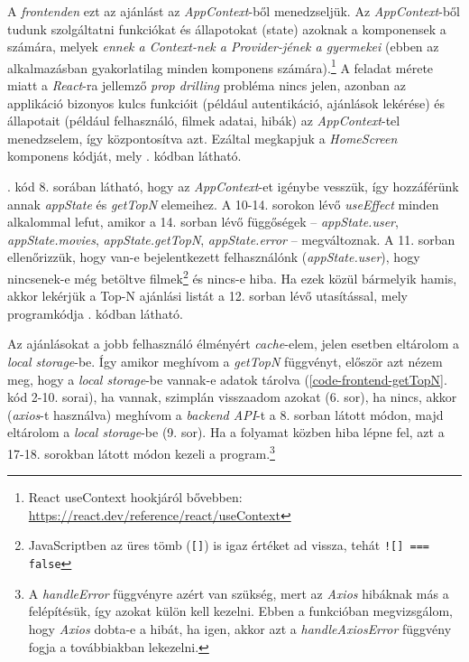 \documentclass[
]{thesis-ekf}
\theoremstyle{definition}
\theoremstyle{remark}
\begin{document}
A \emph{frontenden} ezt az ajánlást az \emph{AppContext}-ből menedzseljük. Az \emph{AppContext}-ből tudunk szolgáltatni funkciókat és állapotokat (state) azoknak a komponensek a számára, melyek \emph{ennek a Context-nek a Provider-jének a gyermekei} (ebben az alkalmazásban gyakorlatilag minden komponens számára).\footnote{React useContext hookjáról bővebben: \url{https://react.dev/reference/react/useContext}} A feladat mérete miatt a \emph{React}-ra jellemző \emph{prop drilling} probléma nincs jelen, azonban az applikáció bizonyos kulcs funkcióit (például autentikáció, ajánlások lekérése) és állapotait (például felhasználó, filmek adatai, hibák) az \emph{AppContext}-tel menedzselem, így központosítva azt. Ezáltal megkapjuk a \emph{HomeScreen} komponens kódját, mely . kódban látható.



. kód 8. sorában látható, hogy az \emph{AppContext}-et igénybe vesszük, így hozzáférünk annak \emph{appState} és \emph{getTopN} elemeihez. A 10-14. sorokon lévő \emph{useEffect} minden alkalommal lefut, amikor a 14. sorban lévő függőségek -- \emph{appState.user}, \emph{appState.movies}, \emph{appState.getTopN}, \emph{appState.error} -- megváltoznak. A 11. sorban ellenőrizzük, hogy van-e bejelentkezett felhasználónk (\emph{appState.user}), hogy nincsenek-e még betöltve  filmek\footnote{JavaScriptben az üres tömb (\texttt{[]}) is igaz értéket ad vissza, tehát \texttt{![] === false}} és nincs-e hiba. Ha ezek közül bármelyik hamis, akkor lekérjük a Top-N ajánlási listát a 12. sorban lévő utasítással, mely programkódja . kódban látható.



Az ajánlásokat a jobb felhasználó élményért \emph{cache}-elem, jelen esetben eltárolom a \emph{local storage}-be. Így amikor meghívom a \emph{getTopN} függvényt, először azt nézem meg, hogy a \emph{local storage}-be vannak-e adatok tárolva (\ref{code-frontend-getTopN}. kód 2-10. sorai), ha vannak, szimplán visszaadom azokat (6. sor), ha nincs, akkor (\emph{axios}-t használva) meghívom a \emph{backend API}-t a 8. sorban látott módon, majd eltárolom a \emph{local storage}-be (9. sor). Ha a folyamat közben hiba lépne fel, azt a 17-18. sorokban látott módon kezeli a program.\footnote{A \emph{handleError} függvényre azért van szükség, mert az \emph{Axios} hibáknak más a felépítésük, így azokat külön kell kezelni. Ebben a funkcióban megvizsgálom, hogy \emph{Axios} dobta-e a hibát, ha igen, akkor azt a \emph{handleAxiosError} függvény fogja a továbbiakban lekezelni.}
\end{document}
